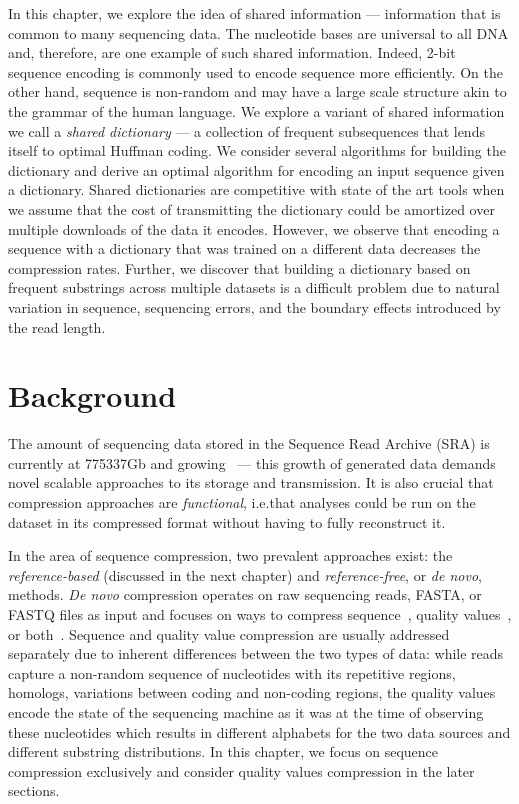 \documentclass[12pt]{cmuthesis}
\begin{document}
In this chapter, we explore the idea of shared information --- information that is common to many sequencing data. The nucleotide bases are universal to all DNA and, therefore, are one example of such shared information. Indeed, 2-bit sequence encoding is commonly used to encode sequence more efficiently. On the other hand, sequence is non-random and may have a large scale structure akin to the grammar of the human language. We explore a variant of shared information we call a \textit{shared dictionary} --- a collection of frequent subsequences that lends itself to optimal Huffman coding. We consider several algorithms for building the dictionary and derive an optimal algorithm for encoding an input sequence given a dictionary. Shared dictionaries are competitive with state of the art tools when we assume that the cost of transmitting the dictionary could be amortized over multiple downloads of the data it encodes. However, we observe that encoding a sequence with a dictionary that was trained on a different data decreases the compression rates. Further, we discover that building a dictionary based on frequent substrings across multiple datasets is a difficult problem due to natural variation in sequence, sequencing errors, and the boundary effects introduced by the read length.


\section{Background}


The amount of sequencing data stored in the Sequence Read Archive (SRA) is currently at 775337Gb and growing~\cite{SRA} --- this growth of generated data demands novel scalable approaches to its storage and transmission. It is also crucial that compression approaches are \textit{functional}, i.e.\@ that analyses could be run on the dataset in its compressed format without having to fully reconstruct it. 


In the area of sequence compression, two prevalent approaches exist: the \textit{reference-based} (discussed in the next chapter) and \textit{reference-free}, or \textit{de novo}, methods. \textit{De novo} compression operates on raw sequencing reads, FASTA, or FASTQ files as input and focuses on ways to compress sequence~\cite{Mince,PathEncode,Rozov2014}, quality values~\cite{SeqSqueeze,KmerQuals,JaninQuals}, or both~\cite{GSQZ,Sahinalp2012}. 
Sequence and quality value compression are usually addressed separately due to inherent differences between the two types of data: while reads capture a non-random sequence of nucleotides with its repetitive regions, homologs, variations between coding and non-coding regions, the quality values encode the state of the sequencing machine as it was at the time of observing these nucleotides which results in different alphabets for the two data sources and different substring distributions. In this chapter, we focus on sequence compression exclusively and consider quality values compression in the later sections.
\end{document}
